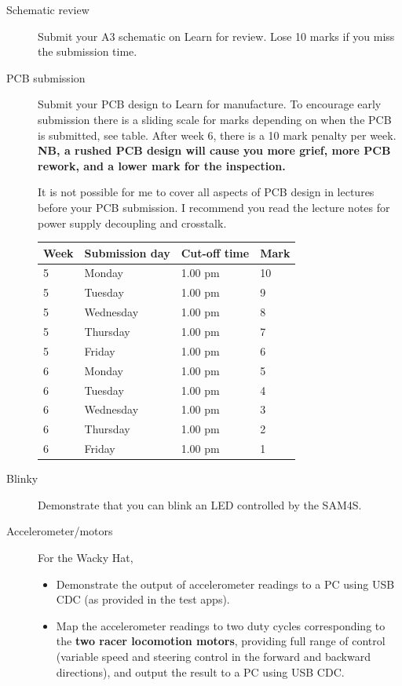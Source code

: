 \documentclass[11pt, a4paper]{article}
\begin{document}
\begin{description}
\item [Schematic review] Submit your A3 schematic on Learn for
  review.  Lose 10 marks if you miss the submission time.

\item [PCB submission] Submit your PCB design to Learn for
  manufacture.  To encourage early submission there is a sliding scale
  for marks depending on when the PCB is submitted, see table.  After
  week 6, there is a 10 mark penalty per week.  \textbf{NB, a rushed
    PCB design will cause you more grief, more PCB rework, and a lower
    mark for the inspection.}

  It is not possible for me to cover all aspects of PCB design in
  lectures before your PCB submission.  I recommend you read the
  lecture notes for power supply decoupling and crosstalk.

  \begin{tabular}{llll}
    Week & Submission day & Cut-off time  & Mark \\ \hline
    5    & Monday       & 1.00 pm & 10 \\
    5    & Tuesday      & 1.00 pm & 9 \\
    5    & Wednesday    & 1.00 pm & 8 \\
    5    & Thursday     & 1.00 pm & 7 \\
    5    & Friday       & 1.00 pm & 6 \\
    6    & Monday       & 1.00 pm & 5 \\
    6    & Tuesday      & 1.00 pm & 4 \\
    6    & Wednesday    & 1.00 pm & 3 \\
    6    & Thursday     & 1.00 pm & 2 \\
    6    & Friday       & 1.00 pm & 1  \\
  \end{tabular}

\item [Blinky] Demonstrate that you can blink an LED controlled by the SAM4S.

\item [Accelerometer/motors]
  For the Wacky Hat,
  \begin{itemize}
  \item Demonstrate the output of accelerometer readings to a PC using USB CDC (as provided in the test apps).
  \item Map the accelerometer readings to two duty cycles corresponding to the \textbf{two racer locomotion motors}, providing full range of control (variable speed and steering control in the forward and backward directions), and output the result to a PC using USB CDC.
  \end{itemize}


\end{description}
\end{document}
